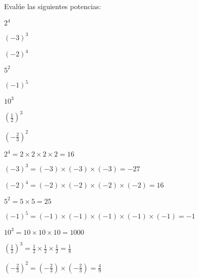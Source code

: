 \begin{exercise}
\problem Evalúe las siguientes potencias:

\begin{exerciselist}
    \item $2^4$
    \item $(-3)^3$
    \item $(-2)^4$
    \item $5^2$
    \item $(-1)^5$
    \item $10^3$
    \item $\left(\frac{1}{2}\right)^3$
    \item $\left(-\frac{2}{3}\right)^2$
\end{exerciselist}

\begin{solucion}
\begin{exerciselist}
    \item $2^4 = 2 \times 2 \times 2 \times 2 = 16$
    \item $(-3)^3 = (-3) \times (-3) \times (-3) = -27$
    \item $(-2)^4 = (-2) \times (-2) \times (-2) \times (-2) = 16$
    \item $5^2 = 5 \times 5 = 25$
    \item $(-1)^5 = (-1) \times (-1) \times (-1) \times (-1) \times (-1) = -1$
    \item $10^3 = 10 \times 10 \times 10 = 1000$
    \item $\left(\frac{1}{2}\right)^3 = \frac{1}{2} \times \frac{1}{2} \times \frac{1}{2} = \frac{1}{8}$
    \item $\left(-\frac{2}{3}\right)^2 = \left(-\frac{2}{3}\right) \times \left(-\frac{2}{3}\right) = \frac{4}{9}$
\end{exerciselist}
\end{solucion}
\end{exercise}

